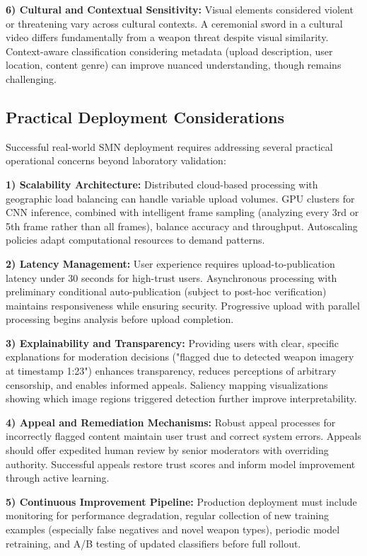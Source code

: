 \documentclass[conference]{IEEEtran}
\begin{document}
\textbf{6) Cultural and Contextual Sensitivity:} Visual elements considered violent or threatening vary across cultural contexts. A ceremonial sword in a cultural video differs fundamentally from a weapon threat despite visual similarity. Context-aware classification considering metadata (upload description, user location, content genre) can improve nuanced understanding, though remains challenging.

\subsection{Practical Deployment Considerations}

Successful real-world SMN deployment requires addressing several practical operational concerns beyond laboratory validation:

\textbf{1) Scalability Architecture:} Distributed cloud-based processing with geographic load balancing can handle variable upload volumes. GPU clusters for CNN inference, combined with intelligent frame sampling (analyzing every 3rd or 5th frame rather than all frames), balance accuracy and throughput. Autoscaling policies adapt computational resources to demand patterns.

\textbf{2) Latency Management:} User experience requires upload-to-publication latency under 30 seconds for high-trust users. Asynchronous processing with preliminary conditional auto-publication (subject to post-hoc verification) maintains responsiveness while ensuring security. Progressive upload with parallel processing begins analysis before upload completion.

\textbf{3) Explainability and Transparency:} Providing users with clear, specific explanations for moderation decisions ("flagged due to detected weapon imagery at timestamp 1:23") enhances transparency, reduces perceptions of arbitrary censorship, and enables informed appeals. Saliency mapping visualizations showing which image regions triggered detection further improve interpretability.

\textbf{4) Appeal and Remediation Mechanisms:} Robust appeal processes for incorrectly flagged content maintain user trust and correct system errors. Appeals should offer expedited human review by senior moderators with overriding authority. Successful appeals restore trust scores and inform model improvement through active learning.

\textbf{5) Continuous Improvement Pipeline:} Production deployment must include monitoring for performance degradation, regular collection of new training examples (especially false negatives and novel weapon types), periodic model retraining, and A/B testing of updated classifiers before full rollout.
\end{document}
